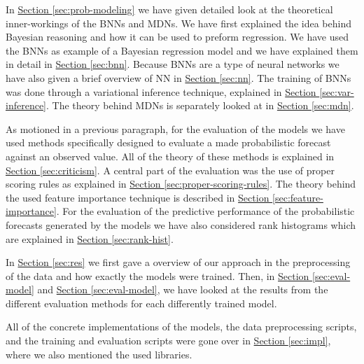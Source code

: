 \documentclass[12pt,a4paper,twoside]{scrartcl}
\numberwithin{equation}{section}
\newcommand{\refsec}[1]{\hyperref[#1]{Section \ref*{#1}}}
\begin{document}
In \refsec{sec:prob-modeling} we have given detailed look at the theoretical inner-workings of the BNNs and MDNs. We have first explained the idea behind Bayesian reasoning and how it can be used to preform regression. We have used the BNNs as example of a Bayesian regression model and we have explained them in detail in \refsec{sec:bnn}. Because BNNs are a type of neural networks we have also given a brief overview of NN in \refsec{sec:nn}. The training of BNNs was done through a variational inference technique, explained in \refsec{sec:var-inference}. The theory behind MDNs is separately looked at in \refsec{sec:mdn}.

As motioned in a previous paragraph, for the evaluation of the models we have used methods specifically designed to evaluate a made probabilistic forecast against an observed value. All of the theory of these methods is explained in \refsec{sec:criticism}. A central part of the evaluation was the use of proper scoring rules as explained in \refsec{sec:proper-scoring-rules}. The theory behind the used feature importance technique is described in \refsec{sec:feature-importance}. For the evaluation of the predictive performance of the probabilistic forecasts generated by the models we have also considered rank histograms which are explained in \refsec{sec:rank-hist}.

In \refsec{sec:res} we first gave a overview of our approach in the preprocessing of the data and how exactly the models were trained. Then, in \refsec{sec:eval-model} and \refsec{sec:eval-model}, we have looked at the results from the different evaluation methods for each differently trained model.

All of the concrete implementations of the models, the data preprocessing scripts, and the training and evaluation scripts were gone over in \refsec{sec:impl}, where we also mentioned the used libraries.
\clearpage
\end{document}
